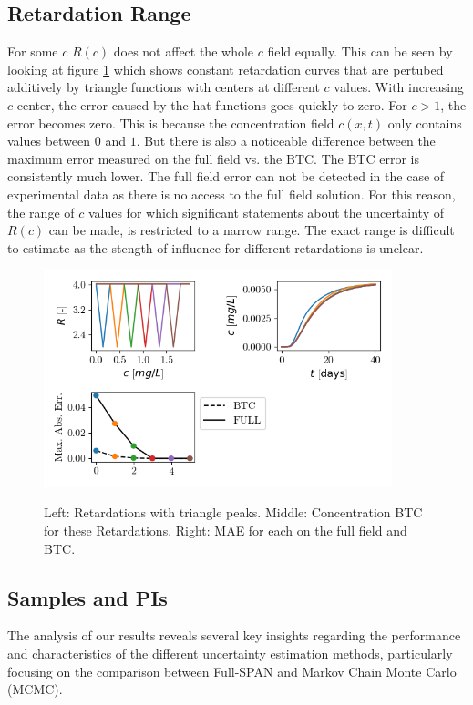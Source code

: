\documentclass{article}
\begin{document}
\subsection{Retardation Range} %
For some $c$ $R(c)$ does not affect the whole $c$ field equally. This can be seen by looking at figure \ref{fig:triangle_ret_pertubation} which shows constant retardation curves that are pertubed additively by triangle functions with centers at different $c$ values. With increasing $c$ center, the error caused by the hat functions goes quickly to zero. For $c > 1$, the error becomes zero. This is because the concentration field $c(x,t)$ only contains values between $0$ and $1$. But there is also a noticeable difference between the maximum error measured on the full field vs. the BTC. The BTC error is consistently much lower.
The full field error can not be detected in the case of experimental data as there is no access to the full field solution. For this reason, the range of $c$ values for which significant statements about the uncertainty of $R(c)$ can be made, is restricted to a narrow range. The exact range is difficult to estimate as the stength of influence for different retardations is unclear.


\begin{figure}
    \centering
    \includegraphics[width=0.9\textwidth]{figs/triangle_ret_pertubation.png}
    \label{fig:triangle_ret_pertubation}
    \caption{Left: Retardations with triangle peaks. Middle: Concentration BTC for these Retardations. Right: MAE for each on the full field and BTC.}
\end{figure}


\subsection{Samples and PIs}
The analysis of our results reveals several key insights regarding the performance and characteristics of the different uncertainty estimation methods, particularly focusing on the comparison between Full-SPAN and Markov Chain Monte Carlo (MCMC).
\end{document}
